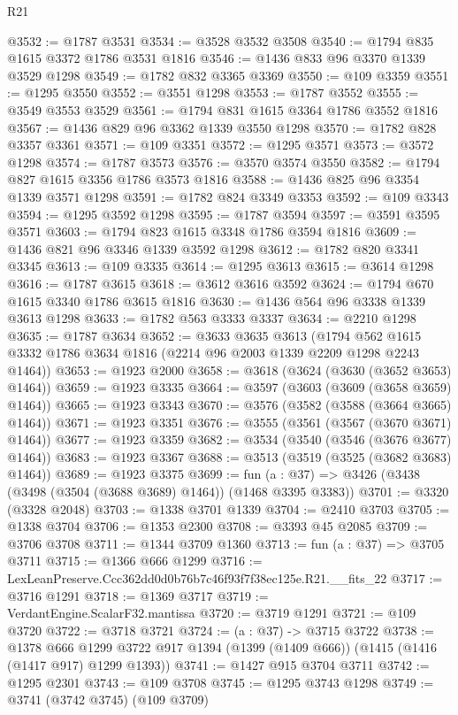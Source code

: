 \begin{lexlean}{R21}
\begin{coremodule}
@3532 := @1787 @3531
@3534 := @3528 @3532 @3508
@3540 := @1794 @835 @1615 @3372 @1786 @3531 @1816
@3546 := @1436 @833 @96 @3370 @1339 @3529 @1298
@3549 := @1782 @832 @3365 @3369
@3550 := @109 @3359
@3551 := @1295 @3550
@3552 := @3551 @1298
@3553 := @1787 @3552
@3555 := @3549 @3553 @3529
@3561 := @1794 @831 @1615 @3364 @1786 @3552 @1816
@3567 := @1436 @829 @96 @3362 @1339 @3550 @1298
@3570 := @1782 @828 @3357 @3361
@3571 := @109 @3351
@3572 := @1295 @3571
@3573 := @3572 @1298
@3574 := @1787 @3573
@3576 := @3570 @3574 @3550
@3582 := @1794 @827 @1615 @3356 @1786 @3573 @1816
@3588 := @1436 @825 @96 @3354 @1339 @3571 @1298
@3591 := @1782 @824 @3349 @3353
@3592 := @109 @3343
@3594 := @1295 @3592 @1298
@3595 := @1787 @3594
@3597 := @3591 @3595 @3571
@3603 := @1794 @823 @1615 @3348 @1786 @3594 @1816
@3609 := @1436 @821 @96 @3346 @1339 @3592 @1298
@3612 := @1782 @820 @3341 @3345
@3613 := @109 @3335
@3614 := @1295 @3613
@3615 := @3614 @1298
@3616 := @1787 @3615
@3618 := @3612 @3616 @3592
@3624 := @1794 @670 @1615 @3340 @1786 @3615 @1816
@3630 := @1436 @564 @96 @3338 @1339 @3613 @1298
@3633 := @1782 @563 @3333 @3337
@3634 := @2210 @1298
@3635 := @1787 @3634
@3652 := @3633
    @3635
    @3613
    (@1794 @562 @1615 @3332 @1786 @3634 @1816 (@2214 @96 @2003 @1339 @2209 @1298 @2243 @1464))
@3653 := @1923 @2000
@3658 := @3618 (@3624 (@3630 (@3652 @3653) @1464))
@3659 := @1923 @3335
@3664 := @3597 (@3603 (@3609 (@3658 @3659) @1464))
@3665 := @1923 @3343
@3670 := @3576 (@3582 (@3588 (@3664 @3665) @1464))
@3671 := @1923 @3351
@3676 := @3555 (@3561 (@3567 (@3670 @3671) @1464))
@3677 := @1923 @3359
@3682 := @3534 (@3540 (@3546 (@3676 @3677) @1464))
@3683 := @1923 @3367
@3688 := @3513 (@3519 (@3525 (@3682 @3683) @1464))
@3689 := @1923 @3375
@3699 := fun (a : @37) => @3426 (@3438 (@3498 (@3504 (@3688 @3689) @1464)) (@1468 @3395 @3383))
@3701 := @3320 (@3328 @2048)
@3703 := @1338 @3701 @1339
@3704 := @2410 @3703
@3705 := @1338 @3704
@3706 := @1353 @2300
@3708 := @3393 @45 @2085
@3709 := @3706 @3708
@3711 := @1344 @3709 @1360
@3713 := fun (a : @37) => @3705 @3711
@3715 := @1366 @666 @1299
@3716 := LexLeanPreserve.Ccc362dd0d0b76b7c46f93f7f38ec125e.R21.__fits_22
@3717 := @3716 @1291
@3718 := @1369 @3717
@3719 := VerdantEngine.ScalarF32.mantissa
@3720 := @3719 @1291
@3721 := @109 @3720
@3722 := @3718 @3721
@3724 := (a : @37) -> @3715 @3722
@3738 := @1378
    @666
    @1299
    @3722
    @917
    @1394
    (@1399 (@1409 @666))
    (@1415 (@1416 (@1417 @917) @1299 @1393))
@3741 := @1427 @915 @3704 @3711
@3742 := @1295 @2301
@3743 := @109 @3708
@3745 := @1295 @3743 @1298
@3749 := @3741 (@3742 @3745) (@109 @3709)

\end{coremodule}
\end{lexlean}
